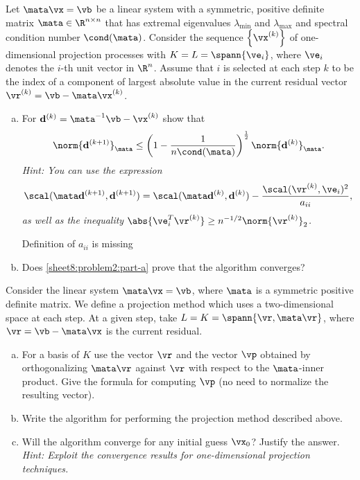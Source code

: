 \begin{Sheet}
  \begin{Problem}
    Let $\mata\vx = \vb$ be a linear system with a symmetric, positive
    definite matrix $\mata\in\R^{n\times n}$ that has extremal
    eigenvalues $\lambda_{\min}$ and $\lambda_{\max}$ and spectral
    condition number $\cond(\mata)$. Consider the sequence
    $\set{\vx^{(k)}}$ of one-dimensional projection processes with
    $K = L = \spann{\ve_i}$, where $\ve_i$ denotes the $i$-th unit
    vector in $\R^n$. Assume that $i$ is selected at each step $k$ to
    be the index of a component of largest absolute value in the
    current residual vector $\vr^{(k)} = \vb - \mata\vx^{(k)}$.
    \begin{enumerate}[(a)]
    \item\label{sheet8:problem2:part-a} For
      $\vd^{(k)} = \mata^{-1}\vb - \vx^{(k)}$ show that
      \begin{gather*}
        \norm{\vd^{(k+1)}}_\mata
        \leq
        \left(1-\frac1{n\cond(\mata)}\right)^{\frac12}
        \norm{\vd^{(k)}}_\mata.
      \end{gather*}
      \textit{Hint: You can use the expression
        \begin{gather*}
          \scal(\mata\vd^{(k+1)},\vd^{(k+1)})
          =\scal(\mata\vd^{(k)},\vd^{(k)})
          -\frac{\scal(\vr^{(k)},\ve_i)^2}{a_{ii}},
        \end{gather*}
        as well as the inequality
        $\abs{\ve_i^T \vr^{(k)}} \geq
        n^{-\nfrac12}\norm{\vr^{(k)}}_2$.}
      \begin{todo}
        Definition of $a_{ii}$ is missing
      \end{todo}
    \item Does \eqref{sheet8:problem2:part-a} prove that the algorithm
      converges?
    \end{enumerate}
  \end{Problem}

  \begin{Problem}
    Consider the linear system $\mata\vx = \vb$, where $\mata$ is a
    symmetric positive definite matrix. We define a projection method
    which uses a two-dimensional space at each step. At a given step,
    take $L = K = \spann{\vr, \mata\vr}$, where $\vr = \vb - \mata\vx$
    is the current residual.
    \begin{enumerate}[(a)]
    \item For a basis of $K$ use the vector $\vr$ and the vector $\vp$
      obtained by orthogonalizing $\mata\vr$ against $\vr$ with
      respect to the $\mata$-inner product. Give the formula for
      computing $\vp$ (no need to normalize the resulting vector).
    \item Write the algorithm for performing the projection method
      described above.
    \item Will the algorithm converge for any initial guess $\vx_0$?
      Justify the answer. \textit{Hint: Exploit the convergence
        results for one-dimensional projection techniques.}
    \end{enumerate}
  \end{Problem}


\end{Sheet}
